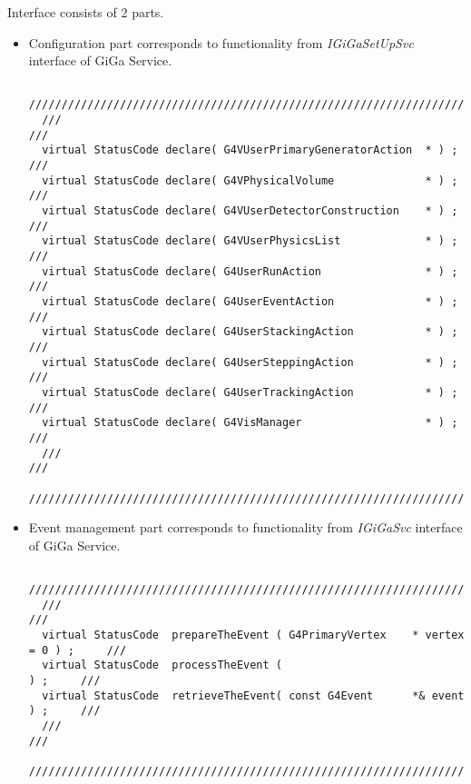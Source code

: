 \documentclass[nfss,times,12pt,a4paper]{article}
\begin{document}
{Interface consists of 2 parts. 
\begin{itemize} 
\item Configuration part corresponds to functionality from 
{\it IGiGaSetUpSvc} interface of {\sc GiGa} Service.  
\begin{tiny}
\begin{verbatim}
  /////////////////////////////////////////////////////////////////////////////////
  ///                                                                           ///
  virtual StatusCode declare( G4VUserPrimaryGeneratorAction  * ) ;              /// 
  virtual StatusCode declare( G4VPhysicalVolume              * ) ;              /// 
  virtual StatusCode declare( G4VUserDetectorConstruction    * ) ;              ///
  virtual StatusCode declare( G4VUserPhysicsList             * ) ;              /// 
  virtual StatusCode declare( G4UserRunAction                * ) ;              /// 
  virtual StatusCode declare( G4UserEventAction              * ) ;              ///
  virtual StatusCode declare( G4UserStackingAction           * ) ;              /// 
  virtual StatusCode declare( G4UserSteppingAction           * ) ;              ///
  virtual StatusCode declare( G4UserTrackingAction           * ) ;              ///
  virtual StatusCode declare( G4VisManager                   * ) ;              ///
  ///                                                                           ///
  /////////////////////////////////////////////////////////////////////////////////
\end{verbatim}  
\end{tiny}
\item Event management part corresponds to functionality from 
{\it IGiGaSvc} interface of {\sc GiGa} Service.  
\begin{tiny}
\begin{verbatim}
  /////////////////////////////////////////////////////////////////////////////////
  ///                                                                           ///
  virtual StatusCode  prepareTheEvent ( G4PrimaryVertex    * vertex = 0 ) ;     ///
  virtual StatusCode  processTheEvent (                                 ) ;     /// 
  virtual StatusCode  retrieveTheEvent( const G4Event      *& event     ) ;     /// 
  ///                                                                           ///
  /////////////////////////////////////////////////////////////////////////////////
\end{verbatim}  
\end{tiny}
\end{itemize} 

}
\end{document}
